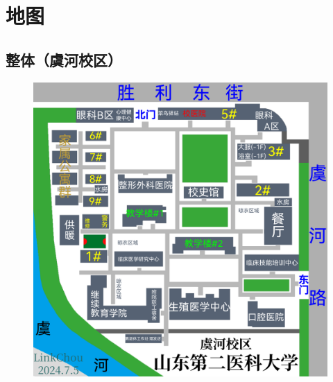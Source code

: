 \newpage
\section[地图]{地图}

\subsection[整体（虞河校区）]{整体（虞河校区）}
\begin{figure}[H]
    \centering
    \vspace{5em}
    \includegraphics*[width=\linewidth]{resources/map/虞河校区.pdf}
    \label{map_yuhe_holistic}
\end{figure}

\newpage

